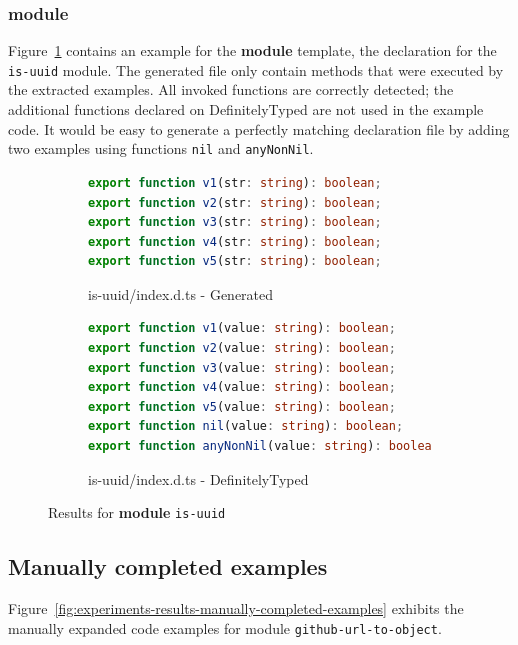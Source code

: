 \documentclass[sigplan,screen]{acmart}
\newcommand{\figref}[1]{Figure~\ref{#1}}
\begin{document}
\subsubsection{module}
\figref{fig:experiments-results-module-is-uuid} contains an example
for the \textbf{module} template, the declaration for the \texttt{is-uuid} module.
The generated file only contain methods that were executed by the extracted
examples. All invoked functions are correctly detected; the additional
functions declared on DefinitelyTyped are not used in the example
code.
It would be easy to generate a perfectly matching declaration file by
adding two examples using functions \texttt{nil} and
\texttt{anyNonNil}.

\begin{figure}[tp]
  \centering
  \begin{subfigure}{0.48\linewidth}
    \begin{lstlisting}[language=TypeScript,numbers=none]
export function v1(str: string): boolean;
export function v2(str: string): boolean;
export function v3(str: string): boolean;
export function v4(str: string): boolean;
export function v5(str: string): boolean;
    \end{lstlisting}
    \caption{is-uuid/index.d.ts - Generated}
  \end{subfigure}
  \hfill
  \begin{subfigure}{0.48\linewidth}
    \begin{lstlisting}[language=TypeScript,numbers=none]
export function v1(value: string): boolean;
export function v2(value: string): boolean;
export function v3(value: string): boolean;
export function v4(value: string): boolean;
export function v5(value: string): boolean;
export function nil(value: string): boolean;
export function anyNonNil(value: string): boolean;
    \end{lstlisting}
    \caption{is-uuid/index.d.ts - DefinitelyTyped}
  \end{subfigure}

  \caption{Results for \textbf{module} \texttt{is-uuid}}
  \label{fig:experiments-results-module-is-uuid}
\end{figure}

\subsection{Manually completed examples}
\label{sec:appendix-manually-completed-examples}
\figref{fig:experiments-results-manually-completed-examples} exhibits the
 manually expanded code examples for module \texttt{github-url-to-object}.
\end{document}
